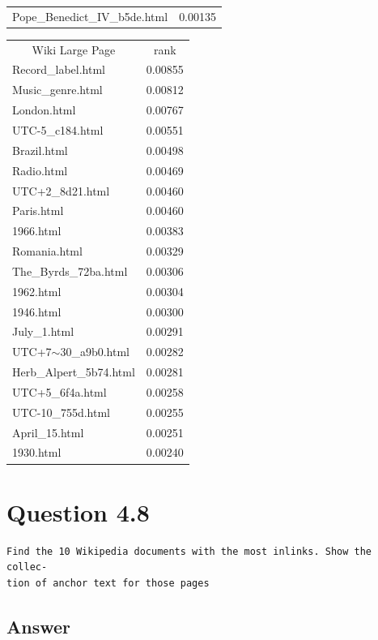 \documentclass[11pt]{article}
\newenvironment{code}{\captionsetup{type=listing}}{}
\begin{document}
\begin{table}[h]
\begin{minipage}{.5\textwidth}
\begin{tabular}{lc|}
Pope\_Benedict\_IV\_b5de.html & 0.00135
\end{tabular}
 \end{minipage}%
    \begin{minipage}{0.5\textwidth}
    \begin{tabular}{lc}
\multicolumn{1}{c}{Wiki Large Page} & rank \\
Record\_label.html & 0.00855 \\
Music\_genre.html & 0.00812 \\
London.html & 0.00767 \\
UTC-5\_c184.html & 0.00551 \\
Brazil.html & 0.00498 \\
Radio.html & 0.00469 \\
UTC+2\_8d21.html & 0.00460 \\
Paris.html & 0.00460 \\
1966.html & 0.00383 \\
Romania.html & 0.00329 \\
The\_Byrds\_72ba.html & 0.00306 \\
1962.html & 0.00304 \\
1946.html & 0.00300 \\
July\_1.html & 0.00291 \\
UTC+7$\sim$30\_a9b0.html & 0.00282 \\
Herb\_Alpert\_5b74.html & 0.00281 \\
UTC+5\_6f4a.html & 0.00258 \\
UTC-10\_755d.html & 0.00255 \\
April\_15.html & 0.00251 \\
1930.html & 0.00240
\end{tabular}
\end{minipage}
\end{table}
\newpage
\begin{code}
	 \label{code:pr}
\end{code}

\newpage
\section{Question 4.8}
\begin{verbatim}
Find the 10 Wikipedia documents with the most inlinks. Show the collec-
tion of anchor text for those pages
\end{verbatim}
\subsection{Answer}
\begin{code}
	 \label{code:wil}
\end{code}
\newpage
\end{document}
